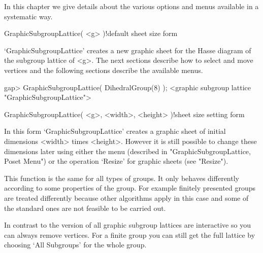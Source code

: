 
In this chapter we give details about the various options and menus
available in a systematic way.


\>GraphicSubgroupLattice( <g> )!{default sheet size form}

`GraphicSubgroupLattice' creates a new graphic sheet for the Hasse
diagram of the subgroup lattice of <g>.  The next sections describe
how to select and move vertices and the following sections describe the
available menus.

\begintt
gap> GraphicSubgroupLattice( DihedralGroup(8) );
<graphic subgroup lattice "GraphicSubgroupLattice">
\endtt

\>GraphicSubgroupLattice( <g>, <width>, <height> )!{sheet size setting form}

In this form `GraphicSubgroupLattice' creates a graphic sheet of initial
dimensions <width> times <height>.  However it is still possible to change
these dimensions later using either the menu (described in
"GraphicSubgroupLattice, Poset Menu") or the operation `Resize' for graphic 
sheets (see "Resize").

This function is the same for all types of groups. It only behaves differently
according to some properties of the group. For example finitely presented
groups are treated differently because other algorithms apply in this case
and some of the standard ones are not feasible to be carried out. 

In contrast to the {} version of {\XGAP} all graphic subgroup lattices 
are interactive so you can always remove vertices. For a finite group you 
can still get the full lattice by choosing `All Subgroups' for the whole 
group.

%


